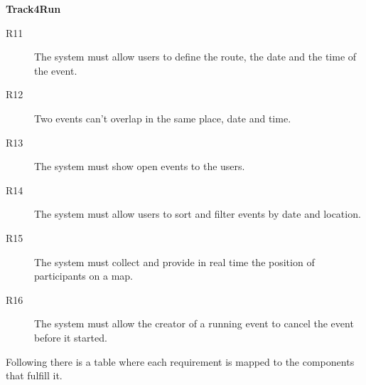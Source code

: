 \documentclass[../main.tex]{subfiles}
\begin{document}
\begin{description}
\begin{description}
  \end{description}

  \item {\bf Track4Run}

  \begin{description}

    \item [R11] The system must allow users to define the route, the date and the time of the event.

    \item [R12] Two events can't overlap in the same place, date and time.

    \item [R13] The system must show open events to the users.

    \item [R14] The system must allow users to sort and filter events by date and location.

    \item [R15] The system must collect and provide in real time the position of participants on a map.

    \item [R16] The system must allow the creator of a running event to cancel the event before it started.

  \end{description}

\end{description}

\newpage

Following there is a table where each requirement is mapped to the components that fulfill it.\\
\end{document}

